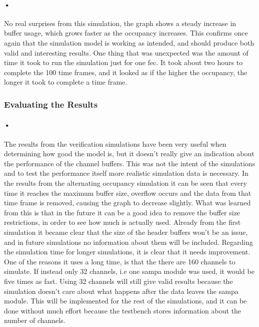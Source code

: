 \documentclass[a4paper, 12pt]{report}\dfrac{\right }{•}
\begin{document}
\paragraph{•} %
No real surprises from this simulation, the graph shows a steady increase in buffer usage, which grows faster as the occupancy increases.
This confirms once again that the simulation model is working as intended, and should produce both valid and interesting results.
One thing that was unexpected was the amount of time it took to run the simulation just for one \gls{fec}.
It took about two hours to complete the 100 time frames, and it looked as if the higher the occupancy, the longer it took to complete a time frame.

\subsubsection{Evaluating the Results}

\paragraph{•}
The results from the verification simulations have been very useful when determining how good the model is, but it doesn't really give an indication about the performance of the channel buffers.
This was not the intent of the simulations and to test the performance itself more realistic simulation data is necessary.
In the results from the alternating occupancy simulation it can be seen that every time it reaches the maximum buffer size, overflow occurs and the data from that time frame is removed, causing the graph to decrease slightly.
What was learned from this is that in the future it can be a good idea to remove the buffer size restrictions, in order to see how much is actually used.
Already from the first simulation it became clear that the size of the header buffers won't be an issue, and in future simulations no information about them will be included. 
Regarding the simulation time for longer simulations, it is clear that it needs improvement.
One of the reasons it uses a long time, is that the there are 160 channels to simulate.
If instead only 32 channels, i.e one \gls{sampa} module was used, it would be five times as fast.
Using 32 channels will still give valid results because the simulation doesn't care about what happens after the data leaves the \gls{sampa} module.
This will be implemented for the rest of the simulations, and it can be done without much effort because the testbench stores information about the number of channels.
\end{document}

